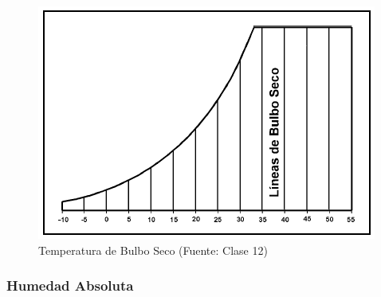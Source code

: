         \begin{multicols}{2}
            \begin{quote}
            \end{quote}
            
            \begin{figure}
                \includegraphics[width=\textwidth]{img/clases/temperatura_bulbo_seco.png}
                \caption{Temperatura de Bulbo Seco (Fuente: Clase 12)}
                \label{fig:temperatura_bulbo_seco}
            \end{figure}
        \end{multicols}
        
        \subsubsection{Humedad Absoluta}
        
